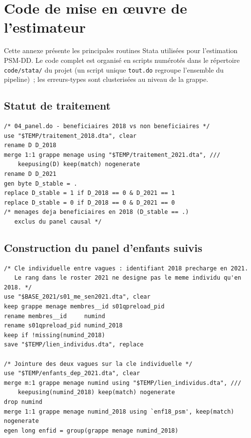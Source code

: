 \section{Code de mise en \oe{}uvre de l'estimateur}
\label{ann:B}

Cette annexe présente les principales routines Stata utilisées pour l'estimation
PSM-DD. Le code complet est organisé en scripts numérotés dans le répertoire
\texttt{code/stata/} du projet (un script unique \texttt{tout.do} regroupe
l'ensemble du pipeline)~;
les erreurs-types sont clusterisées au niveau de la grappe.

\subsection{Statut de traitement}

\begin{verbatim}
/* 04_panel.do - beneficiaires 2018 vs non beneficiaires */
use "$TEMP/traitement_2018.dta", clear
rename D D_2018
merge 1:1 grappe menage using "$TEMP/traitement_2021.dta", ///
    keepusing(D) keep(match) nogenerate
rename D D_2021
gen byte D_stable = .
replace D_stable = 1 if D_2018 == 0 & D_2021 == 1
replace D_stable = 0 if D_2018 == 0 & D_2021 == 0
/* menages deja beneficiaires en 2018 (D_stable == .)
   exclus du panel causal */
\end{verbatim}

\subsection{Construction du panel d'enfants suivis}

\begin{verbatim}
/* Cle individuelle entre vagues : identifiant 2018 precharge en 2021.
   Le rang dans le roster 2021 ne designe pas le meme individu qu'en 2018. */
use "$BASE_2021/s01_me_sen2021.dta", clear
keep grappe menage membres__id s01qpreload_pid
rename membres__id     numind
rename s01qpreload_pid numind_2018
keep if !missing(numind_2018)
save "$TEMP/lien_individus.dta", replace

/* Jointure des deux vagues sur la cle individuelle */
use "$TEMP/enfants_dep_2021.dta", clear
merge m:1 grappe menage numind using "$TEMP/lien_individus.dta", ///
    keepusing(numind_2018) keep(match) nogenerate
drop numind
merge 1:1 grappe menage numind_2018 using `enf18_psm', keep(match) nogenerate
egen long enfid = group(grappe menage numind_2018)
\end{verbatim}

